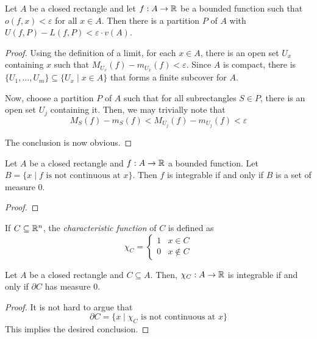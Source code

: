\begin{lemma}
    Let $A$ be a closed rectangle and let $f:A\to\mathbb{R}$ be a bounded function such that $o(f,x) < \varepsilon$ for all $x\in A$. Then there is a partition $P$ of $A$ with $U(f,P) - L(f, P) < \varepsilon\cdot v(A)$.
\end{lemma}
\begin{proof}
    Using the definition of a limit, for each $x\in A$, there is an open set $U_x$ containing $x$ such that $M_{U_x}(f) - m_{U_x}(f) < \varepsilon$. Since $A$ is compact, there is $\{U_1,\ldots, U_m\}\subseteq\{U_x\mid x\in A\}$ that forms a finite subcover for $A$.

    Now, choose a partition $P$ of $A$ such that for all subrectangles $S\in P$, there is an open set $U_j$ containing it. Then, we may trivially note that 
    \begin{equation*}
        M_S(f) - m_S(f) < M_{U_j}(f) - m_{U_j}(f) < \varepsilon
    \end{equation*}

    The conclusion is now obvious.
\end{proof}

\begin{theorem}
    Let $A$ be a closed rectangle and $f:A\to\mathbb{R}$ a bounded function. Let $B = \{x\mid\text{$f$ is not continuous at $x$}\}$. Then $f$ is integrable if and only if $B$ is a set of measure $0$.
\end{theorem}
\begin{proof}
\end{proof}


\begin{definition}
    If $C\subseteq\mathbb{R}^n$, the \textit{characteristic function} of $C$ is defined as 
    \begin{equation*}
        \chi_C = 
        \begin{cases}
            1 & x\in C\\
            0 & x\notin C
        \end{cases}
    \end{equation*}
\end{definition}

\begin{theorem}
    Let $A$ be a closed rectangle and $C\subseteq A$. Then, $\chi_C:A\to\mathbb{R}$ is integrable if and only if $\partial C$ has measure $0$.
\end{theorem}
\begin{proof}
    It is not hard to argue that 
    \begin{equation*}
        \partial C = \{x\mid \text{$\chi_C$ is not continuous at $x$}\}
    \end{equation*}
    This implies the desired conclusion.
\end{proof}


